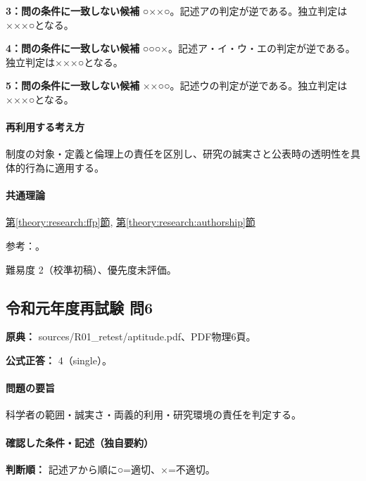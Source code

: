 \noindent\textbf{3：問の条件に一致しない候補} ○××○。記述アの判定が逆である。独立判定は×××○となる。\par

\noindent\textbf{4：問の条件に一致しない候補} ○○○×。記述ア・イ・ウ・エの判定が逆である。独立判定は×××○となる。\par

\noindent\textbf{5：問の条件に一致しない候補} ××○○。記述ウの判定が逆である。独立判定は×××○となる。\par

\paragraph{再利用する考え方} 制度の対象・定義と倫理上の責任を区別し、研究の誠実さと公表時の透明性を具体的行為に適用する。

\paragraph{共通理論} \hyperref[theory:research:ffp]{第\ref*{theory:research:ffp}節}, \hyperref[theory:research:authorship]{第\ref*{theory:research:authorship}節}

\par 参考：\cite{mext_misconduct2014,jsps_integrity2025}。

\par 難易度 2（校準初稿）、優先度未評価。

\subsection{令和元年度再試験 問6}
\label{q:r01-ret-apt-06}

\noindent\textbf{原典：} sources/R01\_retest/aptitude.pdf、PDF物理6頁。

\textbf{公式正答：} 4（single）。

\paragraph{問題の要旨} 科学者の範囲・誠実さ・両義的利用・研究環境の責任を判定する。

\paragraph{確認した条件・記述（独自要約）}\mbox{}\par

\noindent\textbf{判断順：} 記述アから順に○=適切、×=不適切。\par

